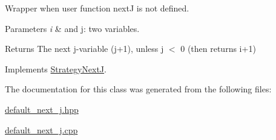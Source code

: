 \-Wrapper when user function next\-J is not defined. 


\begin{DoxyParams}{\-Parameters}
{\em i} & and j\-: two variables. \\
\hline
\end{DoxyParams}
\begin{DoxyReturn}{\-Returns}
\-The next j-\/variable (j+1), unless j $<$ 0 (then returns i+1) 
\end{DoxyReturn}


\-Implements \hyperlink{classStrategyNextJ_ab566c4e5827240b575d0e7445b7ba695}{\-Strategy\-Next\-J}.



\-The documentation for this class was generated from the following files\-:\begin{DoxyCompactItemize}
\item 
\hyperlink{default__next__j_8hpp}{default\-\_\-next\-\_\-j.\-hpp}\item 
\hyperlink{default__next__j_8cpp}{default\-\_\-next\-\_\-j.\-cpp}\end{DoxyCompactItemize}

